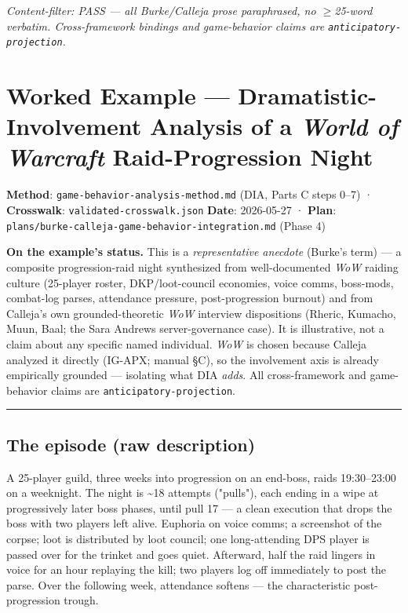 \documentclass[11pt]{report}
\begin{document}
\textit{Content-filter: PASS — all Burke/Calleja prose paraphrased, no $\geq$25-word verbatim. Cross-framework bindings and game-behavior claims are \texttt{anticipatory-\discretionary{}{}{}projection}.}


\clearpage
\section{Worked Example — Dramatistic-Involvement Analysis of a \textit{World of Warcraft} Raid-Progression Night}


\textbf{Method}: \texttt{game-\discretionary{}{}{}behavior-\discretionary{}{}{}analysis-\discretionary{}{}{}method.\discretionary{}{}{}md} (DIA, Parts C steps 0–7) · \textbf{Crosswalk}: \texttt{validated-\discretionary{}{}{}crosswalk.\discretionary{}{}{}json} \textbf{Date}: 2026-05-27 · \textbf{Plan}: \texttt{plans/\discretionary{}{}{}burke-\discretionary{}{}{}calleja-\discretionary{}{}{}game-\discretionary{}{}{}behavior-\discretionary{}{}{}integration.\discretionary{}{}{}md} (Phase 4)


\begin{diabox}
\textbf{On the example's status.} This is a \textit{representative anecdote} (Burke's term) — a composite progression-raid night synthesized from well-documented \textit{WoW} raiding culture (25-player roster, DKP/loot-council economies, voice comms, boss-mods, combat-log parses, attendance pressure, post-progression burnout) and from Calleja's own grounded-theoretic \textit{WoW} interview dispositions (Rheric, Kumacho, Muun, Baal; the Sara Andrews server-governance case). It is illustrative, not a claim about any specific named individual. \textit{WoW} is chosen because Calleja analyzed it directly (IG-APX; manual §C), so the involvement axis is already empirically grounded — isolating what DIA \textit{adds}. All cross-framework and game-behavior claims are \texttt{anticipatory-\discretionary{}{}{}projection}.

\end{diabox}


\vspace{0.4em}\hrule\vspace{0.8em}


\subsection{The episode (raw description)}


A 25-player guild, three weeks into progression on an end-boss, raids 19:30–23:00 on a weeknight. The night is \textasciitilde{}18 attempts ("pulls"), each ending in a wipe at progressively later boss phases, until pull 17 — a clean execution that drops the boss with two players left alive. Euphoria on voice comms; a screenshot of the corpse; loot is distributed by loot council; one long-attending DPS player is passed over for the trinket and goes quiet. Afterward, half the raid lingers in voice for an hour replaying the kill; two players log off immediately to post the parse. Over the following week, attendance softens — the characteristic post-progression trough.
\end{document}
